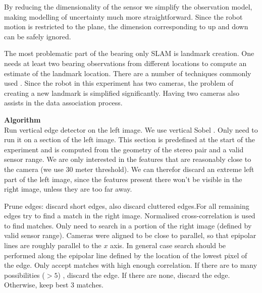 By reducing the dimensionality of the sensor we simplify the
observation model, making modelling of uncertainty much more
straightforward. Since the robot motion is restricted to the plane,
the dimension corresponding to up and down can be safely ignored.

The most problematic part of the bearing only SLAM is landmark
creation. One needs at least two bearing observations from different
locations to compute an estimate of the landmark location. There are a
number of techniques commonly used \cite{bearing_only_slam}. Since the
robot in this experiment has two cameras, the problem of creating a
new landmark is simplified significantly. Having two cameras also
assists in the data association process. 





{\bf Algorithm }\\
Run vertical edge detector on the left image. We use vertical Sobel
\cite{Hartley2004}. Only need to run it on a section of the left
image. This section is predefined at the start of the experiment and
is computed from the geometry of the stereo pair and a valid sensor
range. We are only interested in the features that are reasonably
close to the camera (we use 30 meter threshold). We can therefor
discard an extreme left part of the left image, since the features
present there won't be visible in the right image, unless they are too
far away.

Prune edges: discard short edges, also discard cluttered edges.For all
remaining edges try to find a match in the right image. Normalised
cross-correlation is used to find matches. Only need to search in a
portion of the right image (defined by valid sensor range). Cameras
were aligned to be close to parallel, so that epipolar lines are
roughly parallel to the $x$ axis. In general case search should be
performed along the epipolar line defined by the location of the
lowest pixel of the edge. Only accept matches with high enough
correlation. If there are to many possibilities ($> 5$) , discard the
edge. If there are none, discard the edge. Otherwise, keep best 3
matches.

